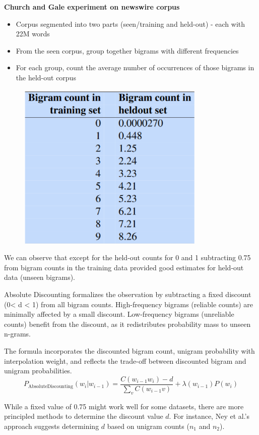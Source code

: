 \documentclass[12pt]{article}
\begin{document}
            \textbf{Church and Gale experiment on newswire corpus}
            \begin{itemize}
                \item Corpus segmented into two parts (seen/training and held-out) - each with 22M words
                \item From the seen corpus, group together bigrams with different frequencies
                \item For each group, count the average number of occurrences of those bigrams in the held-out corpus
            \end{itemize}
            \begin{figure}[h]
                \centering
                \includegraphics[width=0.8\textwidth]{images/abs_disc.png}
            \end{figure}
            
            
            We can observe that except for the held-out counts for 0 and 1 subtracting 0.75 from bigram counts in the training data provided good estimates for held-out data (unseen bigrams).
            
            Absolute Discounting formalizes the observation by subtracting a fixed discount (0< d < 1) from all bigram counts.
            High-frequency bigrams (reliable counts) are minimally affected by a small discount. Low-frequency bigrams (unreliable counts) benefit from the discount, as it redistributes probability mass to unseen n-grams.

            The formula incorporates the discounted bigram count, unigram probability with interpolation weight, and reflects the trade-off between discounted bigram and unigram probabilities.
            \begin{equation}
                P_{\text{AbsoluteDiscounting}}(w_i | w_{i-1}) = \frac{C(w_{i-1}w_i) - d}{\sum_v C(w_{i-1} v)} + \lambda(w_{i-1})P(w_i)
            \end{equation}

            While a fixed value of 0.75 might work well for some datasets, there are more principled methods to determine the discount value $d$. For instance, Ney et al.'s approach suggests determining $d$ based on unigram counts ($n_1$ and $n_2$).
            
\end{document}
